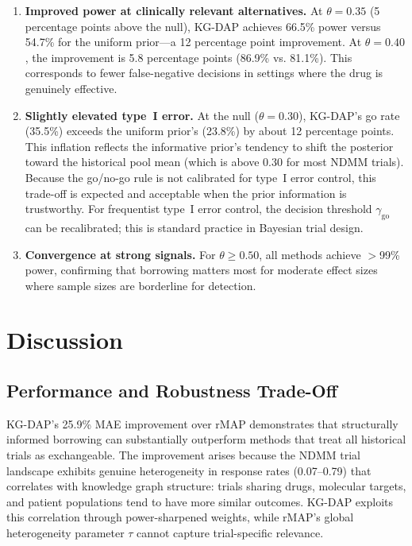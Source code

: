 \documentclass[12pt]{article}
\begin{document}
\begin{enumerate}
\item \textbf{Improved power at clinically relevant alternatives.} At $\theta = 0.35$ (5 percentage points above the null), KG-DAP achieves 66.5\% power versus 54.7\% for the uniform prior---a 12 percentage point improvement. At $\theta = 0.40$, the improvement is 5.8 percentage points (86.9\% vs. 81.1\%). This corresponds to fewer false-negative decisions in settings where the drug is genuinely effective.

\item \textbf{Slightly elevated type~I error.} At the null ($\theta = 0.30$), KG-DAP's go rate (35.5\%) exceeds the uniform prior's (23.8\%) by about 12 percentage points. This inflation reflects the informative prior's tendency to shift the posterior toward the historical pool mean (which is above 0.30 for most NDMM trials). Because the go/no-go rule is not calibrated for type~I error control, this trade-off is expected and acceptable when the prior information is trustworthy. For frequentist type~I error control, the decision threshold $\gamma_{\mathrm{go}}$ can be recalibrated; this is standard practice in Bayesian trial design.

\item \textbf{Convergence at strong signals.} For $\theta \geq 0.50$, all methods achieve $>$99\% power, confirming that borrowing matters most for moderate effect sizes where sample sizes are borderline for detection.
\end{enumerate}

\section{Discussion}
\label{sec:discussion}

\subsection{Performance and Robustness Trade-Off}

KG-DAP's 25.9\% MAE improvement over rMAP demonstrates that structurally informed borrowing can substantially outperform methods that treat all historical trials as exchangeable. The improvement arises because the NDMM trial landscape exhibits genuine heterogeneity in response rates (0.07--0.79) that correlates with knowledge graph structure: trials sharing drugs, molecular targets, and patient populations tend to have more similar outcomes. KG-DAP exploits this correlation through power-sharpened weights, while rMAP's global heterogeneity parameter $\tau$ cannot capture trial-specific relevance.
\end{document}
